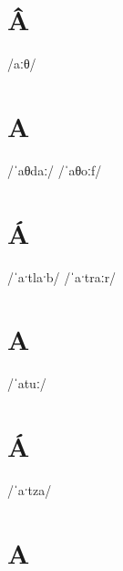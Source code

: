 \documentclass[10pt,a4paper,twoside]{book}
\begin{document}
\section*{Â}

\begin{multicols}{3}
 {/aːθ/} {}
\end{multicols}

\section*{A}

\begin{multicols}{3}
 {/ˈaθdaː/} {}
 {/ˈaθoːf/} {}
\end{multicols}

\section*{Á}

\begin{multicols}{3}
 {/ˈaˑtlaˑb/} {}
 {/ˈaˑtraːr/} {}
\end{multicols}

\section*{A}

\begin{multicols}{3}
 {/ˈatuː/} {}
\end{multicols}

\section*{Á}

\begin{multicols}{3}
 {/ˈaˑtza/} {}
\end{multicols}

\section*{A}
\end{document}
